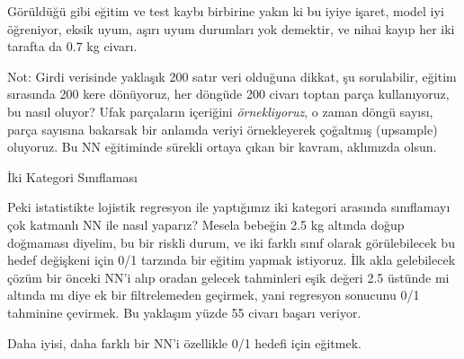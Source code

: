 \documentclass[12pt,fleqn]{article}\usepackage{../../common}
\begin{document}
Görüldüğü gibi eğitim ve test kaybı birbirine yakın ki bu iyiye işaret,
model iyi öğreniyor, eksik uyum, aşırı uyum durumları yok demektir, ve
nihai kayıp her iki tarafta da 0.7 kg civarı.

Not: Girdi verisinde yaklaşık 200 satır veri olduğuna dikkat, şu
sorulabilir, eğitim sırasında 200 kere dönüyoruz, her döngüde 200 civarı
toptan parça kullanıyoruz, bu nasıl oluyor? Ufak parçaların içeriğini {\em
 örnekliyoruz}, o zaman döngü sayısı, parça sayısına bakarsak bir anlamda
veriyi örnekleyerek çoğaltmış (upsample) oluyoruz. Bu NN eğitiminde sürekli
ortaya çıkan bir kavram, aklımızda olsun. 

İki Kategori Sınıflaması

Peki istatistikte lojistik regresyon ile yaptığımız iki kategori arasında
sınıflamayı çok katmanlı NN ile nasıl yaparız? Mesela bebeğin 2.5 kg
altında doğup doğmaması diyelim, bu bir riskli durum, ve iki farklı sınıf
olarak görülebilecek bu hedef değişkeni için 0/1 tarzında bir eğitim yapmak
istiyoruz. İlk akla gelebilecek çözüm bir önceki NN'i alıp oradan gelecek
tahminleri eşik değeri 2.5 üstünde mi altında mı diye ek bir filtrelemeden
geçirmek, yani regresyon sonucunu 0/1 tahminine çevirmek.  Bu yaklaşım
yüzde 55 civarı başarı veriyor.

Daha iyisi, daha farklı bir NN'i özellikle 0/1 hedefi için eğitmek.
\end{document}
